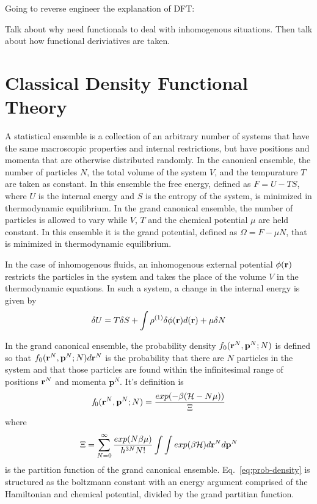 Going to reverse engineer the explanation of DFT:

Talk about why need functionals to deal with inhomogenous situations.
Then talk about how functional deriviatives are taken.

\section{Classical Density Functional Theory}

A statistical ensemble is a collection of an arbitrary number of
systems that have the same macroscopic properties and internal
restrictions, but have positions and momenta that are otherwise
distributed randomly.  In the canonical ensemble, the number of
particles $N$, the total volume of the system $V$, and the tempurature
$T$ are taken as constant.  In this ensemble the free energy, defined
as $F = U - TS$, where $U$ is the internal energy and $S$ is the
entropy of the system, is minimized in thermodynamic equilibrium. In
the grand canonical ensemble, the number of particles is allowed to
vary while $V$, $T$ and the chemical potential $\mu$ are held constant.
In this ensemble it is the grand potential, defined as $\Omega = F -
\mu N$, that is minimized in thermodynamic equilibrium.

In the case of inhomogenous fluids, an inhomogenous external potential
$\phi(\textbf{r})$ restricts the particles in the system and takes the place
of the volume $V$ in the thermodynamic equations.  In such a system, a
change in the internal energy is given by
\begin{align}
  \delta U = T\delta S + \int \rho^{(1)}\delta \phi(\textbf{r})d(\textbf{r}) + \mu \delta N
\end{align}

In the grand canonical ensemble, the probability density
$f_0(\textbf{r}^N,\mathbf{p}^N;N)$ is defined so that
$f_0(\textbf{r}^N,\mathbf{p}^N;N)d\textbf{r}^N$ is the probability that there are
$N$ particles in the system and that those particles are found within
the infinitesimal range of positions $\textbf{r}^N$ and momenta
$\mathbf{p}^N$.  It's definition is
\begin{align} \label{eq:prob-density}
  \mathit{f}_0(\textbf{r}^N,\mathbf{p}^N;N) = \frac{exp(-\beta(\mathcal{H}-N\mu))}{\Xi}
\end{align}
where
\begin{align}
  \Xi = \sum_{N=0}^{\infty}\frac{exp(N\beta\mu)}{h^{3N}N!}\int\int exp(\beta \mathcal{H})d\textbf{r}^Nd\mathbf{p}^N
\end{align}
is the partition function of the grand canonical
ensemble. Eq.~\ref{eq:prob-density} is structured as the boltzmann
constant with an energy argument comprised of the Hamiltonian and
chemical potential, divided by the grand partitian function.

